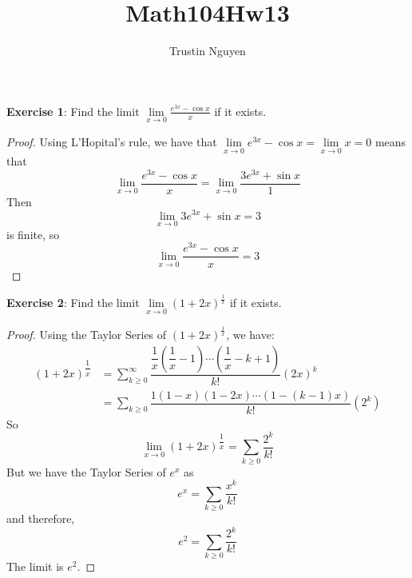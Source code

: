 \documentclass{article}
\title{Math104Hw13}
\author{Trustin Nguyen}
\begin{document}
    \maketitle

\reversemarginpar

\textbf{Exercise 1}: Find the limit $\lim\limits_{x \to 0}\frac{e^{3x} - \cos{x}}{x}$ if it exists.
    \begin{proof}
        Using L'Hopital's rule, we have that $\lim\limits_{x \to 0}e^{3x} - \cos{x} = \lim\limits_{x \to 0}x = 0$ means that 
            \begin{equation*}
                \lim\limits_{x \to 0}\dfrac{e^{3x} - \cos{x}}{x} = \lim\limits_{x \to 0}\dfrac{3e^{3x} + \sin{x}}{1}
            \end{equation*}
        Then
            \begin{equation*}
                \lim\limits_{x \to 0}3e^{3x} + \sin{x} = 3 
            \end{equation*}
        is finite, so 
            \begin{equation*}
                \lim\limits_{x \to 0}\dfrac{e^{3x} - \cos{x}}{x} = 3
            \end{equation*}
    \end{proof}

\textbf{Exercise 2}: Find the limit $\lim\limits_{x \to 0}(1 + 2x)^{\frac{1}{x}}$ if it exists.
    \begin{proof}
        Using the Taylor Series of $(1 + 2x)^{\frac{1}{x}}$, we have:
            \begin{align*}
                (1 + 2x)^{\dfrac{1}{x}} &= \sum_{k \geq 0}^{\infty}\dfrac{\dfrac{1}{x}\left(\dfrac{1}{x} - 1\right)\cdots \left(\dfrac{1}{x} - k + 1\right)}{k!}(2x)^{k} \\
                                        &= \sum_{ k \geq 0}\dfrac{1(1 - x)(1 - 2x)\cdots ( 1 - (k - 1)x)}{k!}(2^{k})
            \end{align*}
        So
            \begin{equation*}
                \lim\limits_{x \to 0}(1 + 2x)^{\dfrac{1}{x}} = \sum_{ k \geq 0}\dfrac{2^{k}}{k!}
            \end{equation*}
        But we have the Taylor Series of $e^{x}$ as
            \begin{equation*}
                e^{x} = \sum_{ k \geq 0}\dfrac{x^{k}}{k!}
            \end{equation*}
        and therefore, 
            \begin{equation*}
                e^{2} = \sum_{ k \geq 0}\dfrac{2^{k}}{k!}
            \end{equation*}
        The limit is $e^{2}$.
    \end{proof}
\end{document}
